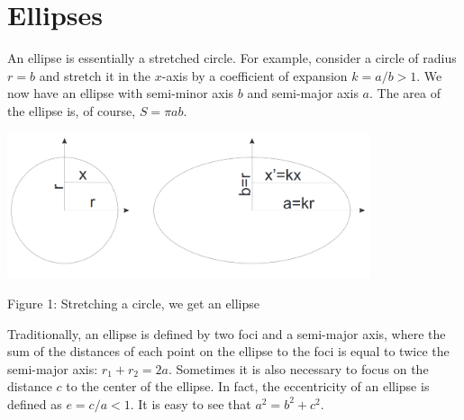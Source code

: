 \documentclass[11pt]{article}
\begin{document}
\section{Ellipses}
\vspace{-5mm}
An ellipse is essentially a stretched circle. For example, consider a circle of radius $r=b$ and stretch it in the $x$-axis by a coefficient of expansion $k=a/b>1$. We now have an ellipse with semi-minor axis $b$ and semi-major axis $a$. The area of the ellipse is, of course, $S=\pi ab$.
\begin{center}
    \includegraphics[width=0.8\textwidth]{Images/CM1.png}
    
    Figure 1: Stretching a circle, we get an ellipse
\end{center}
Traditionally, an ellipse is defined by two foci and a semi-major axis, where the sum of the distances of each point on the ellipse to the foci is equal to twice the semi-major axis: $r_1+r_2=2a$. Sometimes it is also necessary to focus on the distance $c$ to the center of the ellipse. In fact, the eccentricity of an ellipse is defined as $e=c/a<1$. It is easy to see that $a^2=b^2+c^2$.
\end{document}
